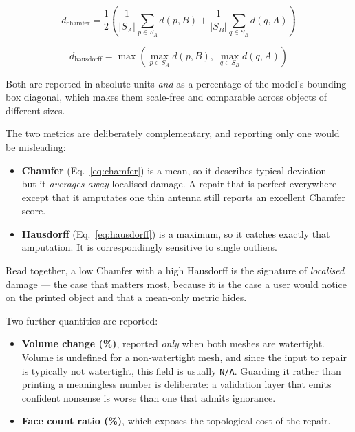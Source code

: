 \documentclass[11pt,a4paper]{article}
\begin{document}
\begin{equation}
d_{\mathrm{chamfer}} =
  \frac{1}{2}\!\left(
  \frac{1}{|S_A|}\sum_{p \in S_A} d(p, B) +
  \frac{1}{|S_B|}\sum_{q \in S_B} d(q, A)
  \right)
\label{eq:chamfer}
\end{equation}

\begin{equation}
d_{\mathrm{hausdorff}} = \max\!\left(
  \max_{p \in S_A} d(p, B),\;
  \max_{q \in S_B} d(q, A)
  \right)
\label{eq:hausdorff}
\end{equation}

Both are reported in absolute units \emph{and} as a percentage of the model's
bounding-box diagonal, which makes them scale-free and comparable across
objects of different sizes.

The two metrics are deliberately complementary, and reporting only one would be
misleading:

\begin{itemize}[leftmargin=*]
  \item \textbf{Chamfer} (Eq.~\ref{eq:chamfer}) is a mean, so it describes
        typical deviation --- but it \emph{averages away} localised damage. A
        repair that is perfect everywhere except that it amputates one thin
        antenna still reports an excellent Chamfer score.
  \item \textbf{Hausdorff} (Eq.~\ref{eq:hausdorff}) is a maximum, so it catches
        exactly that amputation. It is correspondingly sensitive to single
        outliers.
\end{itemize}

Read together, a low Chamfer with a high Hausdorff is the signature of
\emph{localised} damage --- the case that matters most, because it is the case
a user would notice on the printed object and that a mean-only metric hides.

Two further quantities are reported:

\begin{itemize}[leftmargin=*]
  \item \textbf{Volume change (\%)}, reported \emph{only} when both meshes are
        watertight. Volume is undefined for a non-watertight mesh, and since
        the input to repair is typically not watertight, this field is
        usually \texttt{N/A}. Guarding it rather than printing a meaningless
        number is deliberate: a validation layer that emits confident nonsense
        is worse than one that admits ignorance.
  \item \textbf{Face count ratio (\%)}, which exposes the topological cost of
        the repair.
\end{itemize}
\end{document}
